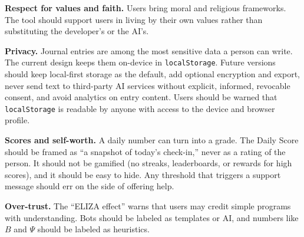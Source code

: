 \documentclass[11pt]{article}
\begin{document}
\textbf{Respect for values and faith.} Users bring moral and religious frameworks. The tool should support users in living by their own values rather than substituting the developer's or the AI's.

\textbf{Privacy.} Journal entries are among the most sensitive data a person can write. The current design keeps them on-device in \texttt{localStorage}. Future versions should keep local-first storage as the default, add optional encryption and export, never send text to third-party AI services without explicit, informed, revocable consent, and avoid analytics on entry content. Users should be warned that \texttt{localStorage} is readable by anyone with access to the device and browser profile.

\textbf{Scores and self-worth.} A daily number can turn into a grade. The Daily Score should be framed as ``a snapshot of today's check-in,'' never as a rating of the person. It should not be gamified (no streaks, leaderboards, or rewards for high scores), and it should be easy to hide. Any threshold that triggers a support message should err on the side of offering help.

\textbf{Over-trust.} The ``ELIZA effect'' \citep{weizenbaum1966} warns that users may credit simple programs with understanding. Bots should be labeled as templates or AI, and numbers like $B$ and $\Psi$ should be labeled as heuristics.
\end{document}
